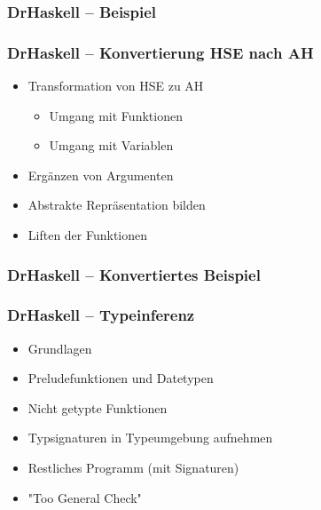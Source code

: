 \begin{frame}[fragile]
\frametitle{DrHaskell -- Beispiel}

\end{frame}

\begin{frame}
	\frametitle{DrHaskell -- Konvertierung HSE nach AH}
	\begin{itemize}
		\item Transformation von HSE zu AH
		  \begin{itemize}
		    \item Umgang mit Funktionen
		    \item Umgang mit Variablen
		  \end{itemize}
		\item Ergänzen von Argumenten
		\item Abstrakte Repräsentation bilden
		\item Liften der Funktionen
	\end{itemize}
\end{frame}

\begin{frame}[fragile]
\frametitle{DrHaskell -- Konvertiertes Beispiel}

\end{frame}

\begin{frame}
  \frametitle{DrHaskell -- Typeinferenz}
  \begin{itemize}
    \item Grundlagen
    \item Preludefunktionen und Datetypen
    \item Nicht getypte Funktionen
    \item Typsignaturen in Typeumgebung aufnehmen
    \item Restliches Programm (mit Signaturen)
    \item "Too General Check"
  \end{itemize}
\end{frame}
